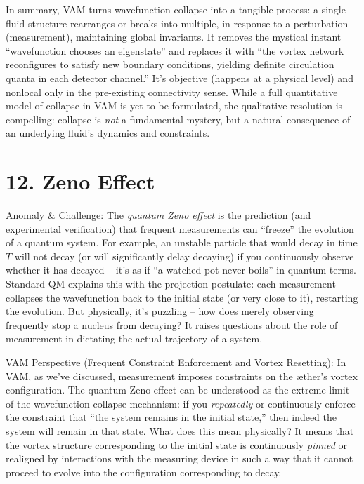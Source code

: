 \documentclass[a4paper, aps,preprint,superscriptaddress, 12pt]{revtex4}
\begin{document}
In summary, VAM turns wavefunction collapse into a tangible process: a single fluid structure rearranges or breaks into multiple, in response to a perturbation (measurement), maintaining global invariants. It removes the mystical instant “wavefunction chooses an eigenstate” and replaces it with “the vortex network reconfigures to satisfy new boundary conditions, yielding definite circulation quanta in each detector channel.” It’s objective (happens at a physical level) and nonlocal only in the pre-existing connectivity sense. While a full quantitative model of collapse in VAM is yet to be formulated, the qualitative resolution is compelling: collapse is \textit{not} a fundamental mystery, but a natural consequence of an underlying fluid’s dynamics and constraints.


\section*{12. Zeno Effect}

Anomaly \& Challenge: The \textit{quantum Zeno effect} is the prediction (and experimental verification) that frequent measurements can “freeze” the evolution of a quantum system. For example, an unstable particle that would decay in time $T$ will not decay (or will significantly delay decaying) if you continuously observe whether it has decayed – it’s as if “a watched pot never boils” in quantum terms. Standard QM explains this with the projection postulate: each measurement collapses the wavefunction back to the initial state (or very close to it), restarting the evolution. But physically, it’s puzzling – how does merely observing frequently stop a nucleus from decaying? It raises questions about the role of measurement in dictating the actual trajectory of a system.


VAM Perspective (Frequent Constraint Enforcement and Vortex Resetting): In VAM, as we’ve discussed, measurement imposes constraints on the æther’s vortex configuration. The quantum Zeno effect can be understood as the extreme limit of the wavefunction collapse mechanism: if you \textit{repeatedly} or continuously enforce the constraint that “the system remains in the initial state,” then indeed the system will remain in that state. What does this mean physically? It means that the vortex structure corresponding to the initial state is continuously \textit{pinned} or realigned by interactions with the measuring device in such a way that it cannot proceed to evolve into the configuration corresponding to decay.
\end{document}
